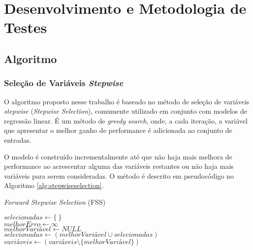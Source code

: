 \chapter[Desenvolvimento e Metodologia]{Desenvolvimento e Metodologia de Testes}

\section{Algoritmo}

\subsection{Seleção de Variáveis \textit{Stepwise}}

O algoritmo proposto nesse trabalho é baseado no método de seleção de variáveis \textit{stepwise} 
(\textit{Stepwise Selection}), comumente utilizado em conjunto com modelos de regressão linear. É um método de \textit{greedy search}, onde, a cada iteração, a variável que apresentar o melhor ganho de performance é adicionada ao conjunto de entradas. 

O modelo é construído incrementalmente até que não haja mais melhora de performance ao acrescentar alguma das variáveis restantes ou não haja mais variáveis para serem consideradas. O método é descrito em pseudocódigo no Algoritmo \ref{alg:stepwiseselection}.

\qquad

\begin{algorithm}[!htb]
    \caption{\textit{Forward Stepwise Selection} (FSS)}
    $selecionadas \gets \{\ \}$ \\
    $melhorErro \gets \infty$ \\
    {   
        $melhorVariável \gets NULL$ \\     
        $selecionadas \gets (melhorVariável \cup selecionadas)$ \\
        $variáveis \gets (variáveis \setminus \{melhorVariável\})$ \\
    }
    \label{alg:stepwiseselection}
\end{algorithm}

